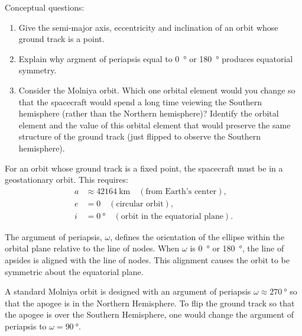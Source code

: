 \begin{hwkProblem}{1}{}

	Conceptual questions:
	\begin{enumerate}
		\item Give the semi-major axis, eccentricity and inclination of an orbit whose ground track is a point.
		\item Explain why argment of periapsis equal to \qty{0}{\degree} or \qty{180}{\degree} produces equatorial symmetry.
		\item Consider the Molniya orbit. Which one orbital element would you change so that the spacecraft would spend a long time veiewing the Southern hemisphere (rather than the Northern hemisphere)? Identify the orbital element and the value of this orbital element that would preserve the same structure of the ground track (just flipped to observe the Southern hemisphere).
	\end{enumerate}

	\hwkSol

	\hwkPart

	For an orbit whose ground track is a fixed point, the spacecraft must be in a geostationary orbit. This requires:
	\begin{align*}
		a &\approx \qty{42164}{\km} \quad (\text{from Earth’s center}), \\
		e &= 0 \quad (\text{circular orbit}), \\
		i &= \qty{0}{\degree} \quad (\text{orbit in the equatorial plane}).
	\end{align*}

	\hwkPart

	The argument of periapsis, \( \omega \), defines the orientation of the ellipse within the orbital plane relative to the line of nodes. When \( \omega \) is \qty{0}{\degree} or \qty{180}{\degree}, the line of apsides is aligned with the line of nodes. This alignment causes the orbit to be symmetric about the equatorial plane.

	\hwkPart

	A standard Molniya orbit is designed with an argument of periapsis \( \omega \approx \qty{270}{\degree} \) so that the apogee is in the Northern Hemisphere. To flip the ground track so that the apogee is over the Southern Hemisphere, one would change the argument of periapsis to \( \omega = \qty{90}{\degree} \).

\end{hwkProblem}
